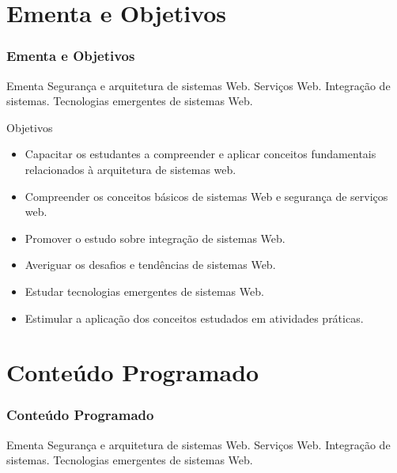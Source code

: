 \documentclass[
	10pt, %
	t, %
]{beamer}
\begin{document}

\section{Ementa e Objetivos}

\begin{frame}
	\frametitle{Ementa e Objetivos}

	\begin{block}{Ementa}
		Segurança e arquitetura de sistemas Web. Serviços Web. Integração de sistemas. Tecnologias emergentes de sistemas Web. 
	\end{block}

	\begin{block}{Objetivos}
		\begin{itemize}
			\item Capacitar os estudantes a compreender e aplicar conceitos fundamentais relacionados à arquitetura de sistemas web.
			\item Compreender os conceitos básicos de sistemas Web e segurança de serviços web.
			\item Promover o estudo sobre integração de sistemas Web.
			\item Averiguar os desafios e tendências de sistemas Web.
			\item Estudar tecnologias emergentes de sistemas Web.
			\item Estimular a aplicação dos conceitos estudados em atividades práticas.
		\end{itemize}
	\end{block}
	
\end{frame}

\section{Conteúdo Programado}

\begin{frame}
	\frametitle{Conteúdo Programado}

	\begin{block}{Ementa}
		Segurança e arquitetura de sistemas Web. Serviços Web. Integração de sistemas. Tecnologias emergentes de sistemas Web. 
	\end{block}

\end{frame}

\end{document}
